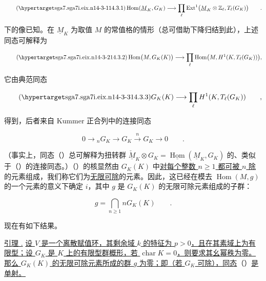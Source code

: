 \begin{equation}\tag{\SGARefTarget{sga7.sga7i.eix.n14-3-1}{14.3.1}}
 \operatorname{Hom}(\underline M_K,G_K)\longrightarrow
 \prod_\ell\operatorname{Ext}^1
 \bigl(\underline M_K\otimes\mathbb Z_\ell,T_\ell(G_K)\bigr)
 \qquad .
\end{equation}

\noindent
下的像已知。在 $\underline M_K$ 为取值 $M$ 的常值格的情形（总可借助下降归结到此），上述同态可解释为

\begin{equation}\tag{\SGARefTarget{sga7.sga7i.eix.n14-3-2}{14.3.2}}
 \operatorname{Hom}\bigl(M,G_K(K)\bigr)\longrightarrow
 \prod_\ell\operatorname{Hom}
 \bigl(M,H^1(K,T_\ell(G_K))\bigr),
\end{equation}

\noindent
它由典范同态

\begin{equation}\tag{\SGARefTarget{sga7.sga7i.eix.n14-3-3}{14.3.3}}
 G_K(K)\longrightarrow\prod_\ell H^1(K,T_\ell(G_K))
 \qquad ,
\end{equation}

\noindent
得到，后者来自 Kummer 正合列中的连接同态

\begin{equation*}
 0\longrightarrow{}_nG_K\longrightarrow G_K
 \xrightarrow{\ n\ }G_K\longrightarrow0\qquad .
\end{equation*}

（事实上，同态（）总可解释为扭转群 $\check{\underline M}_K\otimes G_K=\underline{\operatorname{Hom}}(\underline M_K,G_K)$ 的、类似于（）的连接同态。）（）的核显然由 $G_K(K)$ 中\underline{对每个整数 $n\geq1$ 都可被 $n$ 除}的元素组成，我们称它们为\underline{无限可除}的元素。因此，这已经在模去 $\operatorname{Hom}(M,g)$ 的一个元素的意义下确定 $i$，其中 $g$ 是 $G_K(K)$ 的无限可除元素组成的子群：

\begin{equation*}
 g=\bigcap_{n\geq1}nG_K(K)\qquad .
\end{equation*}

现在有如下结果。

\medskip
\noindent
\underline{引理 .} \underline{设 $V$ 是一个离散赋值环，其剩余域 $k$ 的特征为 $p>0$，且在其素域上为有限型；设 $G_K$ 是 $K$ 上的有限型群概形，若 $\operatorname{char}K=0$，则要求其幺幂秩为零。那么 $G_K(K)$ 的无限可除元素所成的群 $g$ 为零；即（若 $G_K$ 可除），同态}（）\underline{是单射。}

